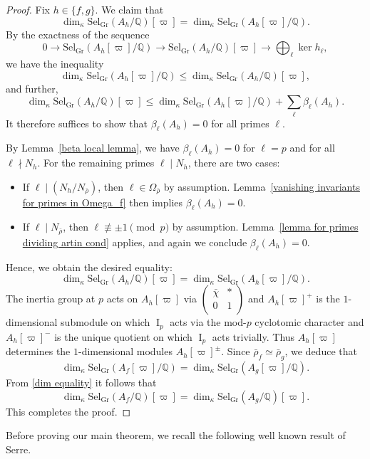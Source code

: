 \documentclass[10pt,a4paper]{amsart}
\newcommand{\Q}{\mathbb{Q}}
\newcommand\mtx[4] { \left( {\begin{array}{cc}
 #1 & #2 \\
 #3 & #4 \\
 \end{array} } \right)}
\newcommand{\op}[1]{\operatorname{#1}}
\begin{document}
\begin{proof}
Fix $h \in \{f, g\}$. We claim that
\[
\dim_{\kappa} \mathrm{Sel}_{\mathrm{Gr}}(A_h/\Q)[\varpi] = \dim_{\kappa} \mathrm{Sel}_{\mathrm{Gr}}(A_h[\varpi]/\Q).
\]
\noindent By the exactness of the sequence
\begin{equation}\label{boring exact sequence}
0 \to \mathrm{Sel}_{\mathrm{Gr}}(A_h[\varpi]/\Q) \to \mathrm{Sel}_{\mathrm{Gr}}(A_h/\Q)[\varpi] \to \bigoplus_\ell \op{ker}h_\ell,
\end{equation}
we have the inequality
\[
\dim_{\kappa} \mathrm{Sel}_{\mathrm{Gr}}(A_h[\varpi]/\Q) \leq \dim_{\kappa} \mathrm{Sel}_{\mathrm{Gr}}(A_h/\Q)[\varpi],
\]
and further,
\[
\dim_{\kappa} \mathrm{Sel}_{\mathrm{Gr}}(A_h/\Q)[\varpi] \leq \dim_{\kappa} \mathrm{Sel}_{\mathrm{Gr}}(A_h[\varpi]/\Q) + \sum_\ell \beta_\ell(A_h).
\]
It therefore suffices to show that $\beta_\ell(A_h) = 0$ for all primes $\ell$.

By Lemma~\ref{beta local lemma}, we have $\beta_\ell(A_h) = 0$ for $\ell = p$ and for all $\ell \nmid N_h$. For the remaining primes $\ell \mid N_h$, there are two cases:

\begin{itemize}
    \item If $\ell \mid (N_h/N_{\bar{\rho}})$, then $\ell \in \Omega_{\bar{\rho}}$ by assumption. Lemma~\ref{vanishing invariants for primes in Omega_f} then implies $\beta_\ell(A_h) = 0$.
    
    \item If $\ell \mid N_{\bar{\rho}}$, then $\ell \not\equiv \pm 1 \pmod{p}$ by assumption. Lemma~\ref{lemma for primes dividing artin cond} applies, and again we conclude $\beta_\ell(A_h) = 0$.
\end{itemize}

Hence, we obtain the desired equality:
\begin{equation}\label{dim equality}\dim_{\kappa} \mathrm{Sel}_{\mathrm{Gr}}(A_h/\Q)[\varpi] = \dim_{\kappa} \mathrm{Sel}_{\mathrm{Gr}}(A_h[\varpi]/\Q).
\end{equation}
The inertia group at $p$ acts on $A_h[\varpi]$ via $\mtx{\bar{\chi}}{\ast}{0}{1}$ and $A_h[\varpi]^+$ is the $1$-dimensional submodule on which $\op{I}_p$ acts via the mod-$p$ cyclotomic character and $A_h[\varpi]^-$ is the unique quotient on which $\op{I}_p$ acts trivially. Thus $A_h[\varpi]$ determines the $1$-dimensional modules $A_h[\varpi]^\pm$. 
Since $\bar{\rho}_f \simeq \bar{\rho}_g$, we deduce that
\[\dim_{\kappa} \mathrm{Sel}_{\mathrm{Gr}}(A_f[\varpi]/\Q)=\dim_{\kappa} \mathrm{Sel}_{\mathrm{Gr}}(A_g[\varpi]/\Q).\]
From \eqref{dim equality} it follows that 
\[\dim_{\kappa} \mathrm{Sel}_{\mathrm{Gr}}(A_f/\Q)[\varpi]=\dim_{\kappa} \mathrm{Sel}_{\mathrm{Gr}}(A_g/\Q)[\varpi].\]
\noindent This completes the proof.
\end{proof} Before proving our main theorem, we recall the following well known result of Serre.
\end{document}
